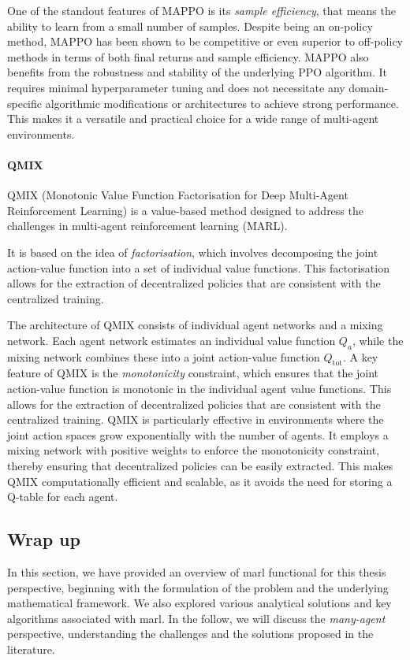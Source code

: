 One of the standout features of MAPPO is its \emph{sample efficiency},
 that means the ability to learn from a small number of samples. 
 Despite being an on-policy method, 
 MAPPO has been shown to be competitive or 
 even superior to off-policy methods in terms of both final returns and sample efficiency. 
%
MAPPO also benefits from the robustness and stability of the underlying PPO algorithm. 
 It requires minimal hyperparameter tuning and does not necessitate any domain-specific algorithmic modifications or architectures to achieve strong performance. 
 This makes it a versatile and practical choice for a wide range of multi-agent environments.
\paragraph*{QMIX}
QMIX (Monotonic Value Function Factorisation for Deep Multi-Agent Reinforcement Learning) 
 is a value-based method designed to address the challenges in multi-agent reinforcement learning (MARL). 

It is based on the idea of \emph{factorisation}, 
 which involves decomposing the joint action-value function into a set of individual value functions. 
 This factorisation allows for the extraction of decentralized policies that are consistent with the centralized training.

The architecture of QMIX consists of individual agent networks and a mixing network. 
 Each agent network estimates an individual value function \( Q_a \), while the mixing network combines these into a joint action-value function \( Q_{\text{tot}} \). 
 A key feature of QMIX is the \emph{monotonicity} constraint, 
 which ensures that the joint action-value function is monotonic in the individual agent value functions. 
 This allows for the extraction of decentralized policies that are consistent with the centralized training.
%
QMIX is particularly effective in environments 
 where the joint action spaces grow exponentially with the number of agents. 
 It employs a mixing network with positive weights to enforce the monotonicity constraint, 
 thereby ensuring that decentralized policies can be easily extracted. 
 This makes QMIX computationally efficient and scalable, as it avoids the need for storing a Q-table for each agent.

\subsection{Wrap up}
In this section, we have provided an overview of \ac{marl} functional for this thesis perspective,
 beginning with the formulation of the problem and the underlying mathematical framework. 
 We also explored various analytical solutions and key algorithms associated with \ac{marl}.
In the follow, we will discuss the \emph{many-agent} perspective, 
understanding the challenges and the solutions proposed in the literature.

